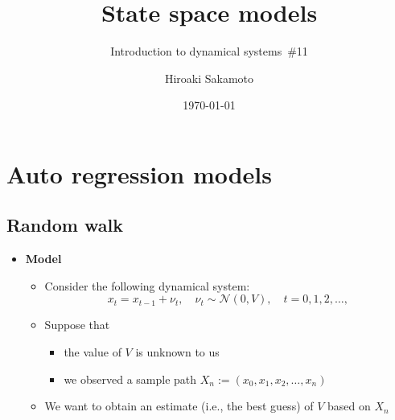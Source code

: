 \documentclass[12pt,a4paper]{article}
\title{State space models}
\subtitle{Introduction to dynamical systems~\#11}
\author{Hiroaki Sakamoto}
\date{\today}
\begin{document}
\maketitle
\tableofcontents

\section{Auto regression models}

\subsection{Random walk}

\begin{itemize}

\item \textbf{Model}
  \begin{itemize}
  \item Consider the following dynamical system:
    \begin{equation}\label{eq:model_random_walk}%
      x_{t} = x_{t-1} + \nu_{t},
      \quad \nu_{t} \sim \mathcal{N}(0,V),
      \quad t = 0, 1, 2, \ldots,
    \end{equation}
  \item Suppose that
    \begin{itemize}
    \item the value of $V$ is unknown to us
    \item we observed a sample path $X_{n}:=(x_{0},x_{1},x_{2},\ldots, x_{n})$
    \end{itemize}
  \item We want to obtain an estimate (i.e., the best guess) of $V$ based on $X_{n}$
  \end{itemize}


\end{itemize}
\end{document}
